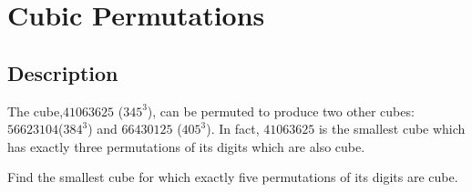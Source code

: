 \section{Cubic Permutations}
\subsection{Description}
The cube,\( 41063625 \) (\( 345^3 \)), can be permuted to produce two other cubes:
\( 56623104 \)(\( 384^3 \)) and \( 66430125 \) (\( 405^3 \)). In fact, \( 41063625 \) is the smallest cube which has exactly three
permutations of its digits which are also cube.

Find the smallest cube for which exactly five permutations of its digits are cube.
